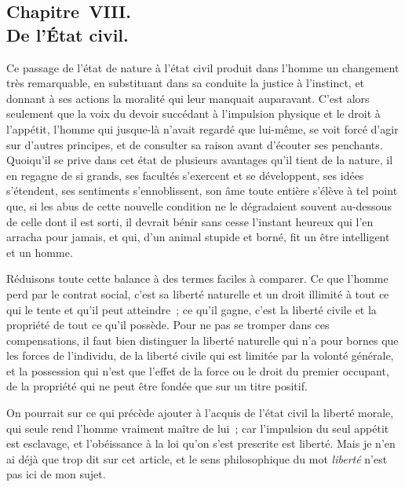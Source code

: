 \documentclass[french,twoside]{book} %
\begin{document}
\subsection[{Chapitre VIII. De l’État civil.}]{Chapitre VIII. \\
De l’État civil.}
\noindent Ce passage de l’état de nature à l’état civil produit dans l’homme un changement très remarquable, en substituant dans sa conduite la justice à l’instinct, et donnant à ses actions la moralité qui leur manquait auparavant. C’est alors seulement que la voix du devoir succédant à l’impulsion physique et le droit à l’appétit, l’homme qui jusque-là n’avait regardé que lui-même, se voit forcé d’agir sur d’autres principes, et de consulter sa raison avant d’écouter ses penchants. Quoiqu’il se prive dans cet état de plusieurs avantages qu’il tient de la nature, il en regagne de si grands, ses facultés s’exercent et se développent, ses idées s’étendent, ses sentiments s’ennoblissent, son âme toute entière s’élève à tel point que, si les abus de cette nouvelle condition ne le dégradaient souvent au-dessous de celle dont il est sorti, il devrait bénir sans cesse l’instant heureux qui l’en arracha pour jamais, et qui, d’un animal stupide et borné, fit un être intelligent et un homme.\par
Réduisons toute cette balance à des termes faciles à comparer. Ce que l’homme perd par le contrat social, c’est sa liberté naturelle et un droit illimité à tout ce qui le tente et qu’il peut atteindre ; ce qu’il gagne, c’est la liberté civile et la propriété de tout ce qu’il possède. Pour ne pas se tromper dans ces compensations, il faut bien distinguer la liberté naturelle qui n’a pour bornes que les forces de l’individu, de la liberté civile qui est limitée par la volonté générale, et la possession qui n’est que l’effet de la force ou le droit du premier occupant, de la propriété qui ne peut être fondée que sur un titre positif.\par
On pourrait sur ce qui précède ajouter à l’acquis de l’état civil la liberté morale, qui seule rend l’homme vraiment maître de lui ; car l’impulsion du seul appétit est esclavage, et l’obéissance à la loi qu’on s’est prescrite est liberté. Mais je n’en ai déjà que trop dit sur cet article, et le sens philosophique du mot {\itshape liberté} n’est pas ici de mon sujet.
\end{document}
